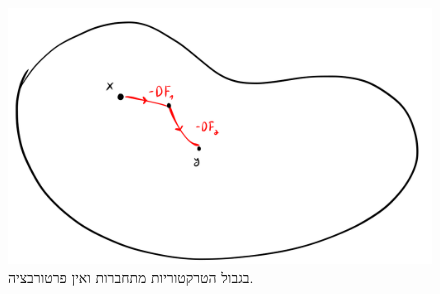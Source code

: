 \documentclass[a4paper,10pt,twoside,openany]{book}
\begin{document}
\begin{figure}
\centering
\includegraphics[scale=0.5]{sources/7.4.b}
\caption{בגבול הטרקטוריות מתחברות ואין פרטורבציה.}
\label{7.4.b}
\end{figure}
\end{document}
